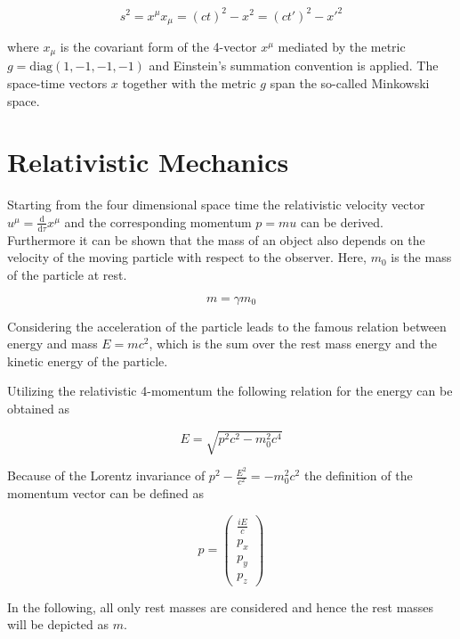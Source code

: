 \begin{equation}\label{linvarianz}
 s^2 = x^\mu x_\mu =  \left(ct\right)^2 - x^2 = \left(ct'\right)^2 - x'^2 
\end{equation}

where $x_\mu$ is the covariant form of the 4-vector $x^\mu$ mediated by the
metric $g= \mathrm{diag}(1,-1,-1,-1)$ and Einstein's summation convention is
applied.
The space-time vectors $x$ together with the metric $g$ span the so-called
Minkowski space.



\section{Relativistic Mechanics}
Starting from the four dimensional space time the relativistic velocity vector
$u^\mu = \frac{\mathrm{d}}{\mathrm{d}\tau} x^\mu$
and the corresponding momentum $p=mu$ can be derived.
Furthermore it can be shown that the mass of an object also depends on the
velocity of the moving particle with respect to the observer. Here, $m_0$ is the
mass of the particle at rest.

\begin{equation}\label{relmasse}
m = \gamma m_0
\end{equation}

Considering the acceleration of the particle leads to the famous relation between
energy and mass $E=mc^2$, which is the sum over the rest mass energy and the
kinetic energy of the particle.

Utilizing the relativistic 4-momentum the following relation for the energy
can be obtained as

\begin{equation}\label{relE}
E = \sqrt{p^2c^2 - m_0^2c^4}
\end{equation}

Because of the Lorentz invariance of $p^2 -\frac{E^2}{c^2} = -m_0^2c^2$
the definition of the momentum vector can be defined as

\begin{equation}\label{viererp}
{p} = \begin{pmatrix}\frac{iE}{c}\\p_x\\p_y\\p_z
\end{pmatrix}
\end{equation}

In the following, all only rest masses are considered and hence the rest masses
will be depicted as $m$.


